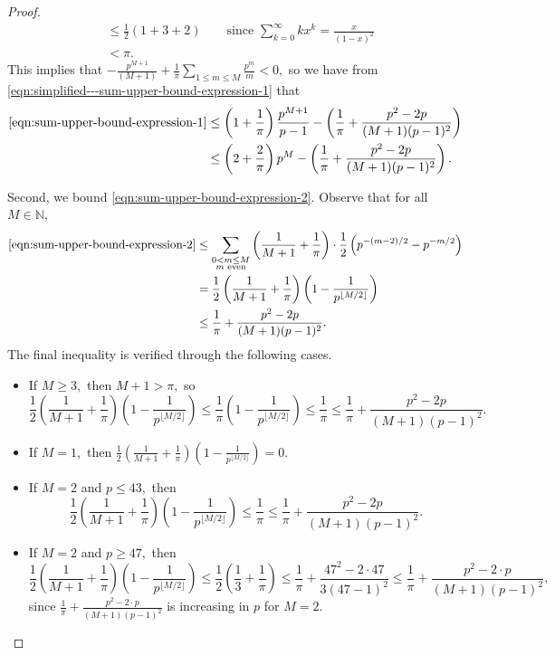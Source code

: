 \documentclass[11pt,letterpaper,reqno]{amsart}
\theoremstyle{definition}
\numberwithin{equation}{section}
\numberwithin{figure}{section}
\numberwithin{table}{section}
\begin{document}
\begin{proof}
\begin{align*}
    &\leq \frac{1}{2} \left( 1 + 3 + 2 \right) \qquad  \text{since $\sum_{k = 0}^\infty k x^k = \frac{x}{(1 - x)^2}$}\\
    &< \pi.
\end{align*}
This implies that $- \frac{p^{M + 1}}{(M + 1)}  + \frac{1}{\pi}  \sum_{1 \leq m \leq M} \frac{p^m}{m} < 0,$ so we have from \eqref{eqn:simplified---sum-upper-bound-expression-1} that
\begin{align}
     \eqref{eqn:sum-upper-bound-expression-1} &\leq \left( 1 + \frac{1}{\pi} \right)\frac{ p^{M + 1} }{p - 1} - \left( \frac{1}{\pi} + \frac{p^2 - 2p}{(M + 1)(p - 1)^2} \right) \\
    &\leq \left(2 + \frac{2}{\pi} \right) p^M - \left( \frac{1}{\pi} + \frac{p^2 - 2p}{(M + 1)(p - 1)^2} \right) \label{eqn:simplified-expression-2}.
\end{align}

Second, we bound \eqref{eqn:sum-upper-bound-expression-2}. Observe that for all $M \in \mathbb{N},$
\begin{align}
    \eqref{eqn:sum-upper-bound-expression-2} &\leq \sum_{\substack{0 < m \leq M\\ \text{$m$ even}}} \left( \frac{1}{M + 1} + \frac{1}{\pi} \right) \cdot \frac{1}{2}\left( p^{-(m - 2)/2} - p^{-m/2}\right)\\
    &= \frac{1}{2}\left( \frac{1}{M + 1} + \frac{1}{\pi} \right) \left( 1 - \frac{1}{p^{\lfloor M/2 \rfloor}} \right)\\
    &\leq  \frac{1}{\pi} + \frac{p^2 - 2p}{(M + 1)(p - 1)^2}.
\end{align}
The final inequality is verified through the following cases.
\begin{itemize}
    \item If $M \geq 3,$ then $M + 1 > \pi,$ so
    $$\frac{1}{2}\left( \frac{1}{M + 1} + \frac{1}{\pi} \right) \left( 1 - \frac{1}{p^{\lfloor M/2 \rfloor}} \right) \leq \frac{1}{\pi} \left( 1 - \frac{1}{p^{\lfloor M/2 \rfloor}} \right) \leq \frac{1}{\pi} \leq \frac{1}{\pi} + \frac{p^2 - 2p}{(M + 1)(p - 1)^2}.$$
    \item If $M = 1,$ then $\frac{1}{2}\left( \frac{1}{M + 1} + \frac{1}{\pi} \right) \left( 1 - \frac{1}{p^{\lfloor M/2 \rfloor}} \right) = 0.$
    \item If $M = 2$ and $p \leq 43,$ then
    $$\frac{1}{2}\left( \frac{1}{M + 1} + \frac{1}{\pi} \right) \left( 1 - \frac{1}{p^{\lfloor M/2 \rfloor}} \right) \leq \frac{1}{\pi} \leq \frac{1}{\pi} + \frac{p^2 - 2p}{(M + 1)(p - 1)^2}.$$
    \item If $M = 2$ and $p \geq 47,$ then
    $$\frac{1}{2}\left( \frac{1}{M + 1} + \frac{1}{\pi} \right) \left( 1 - \frac{1}{p^{\lfloor M/2 \rfloor}} \right) \leq \frac{1}{2} \left( \frac{1}{3} + \frac{1}{\pi} \right) \leq \frac{1}{\pi} + \frac{47^2 - 2 \cdot 47}{3 (47 - 1)^2} \leq \frac{1}{\pi} + \frac{p^2 - 2 \cdot p}{(M + 1) (p - 1)^2},$$
    since $\frac{1}{\pi} + \frac{p^2 - 2 \cdot p}{(M + 1) (p - 1)^2}$ is increasing in $p$ for $M = 2.$
\end{itemize}


\end{proof}
\end{document}
